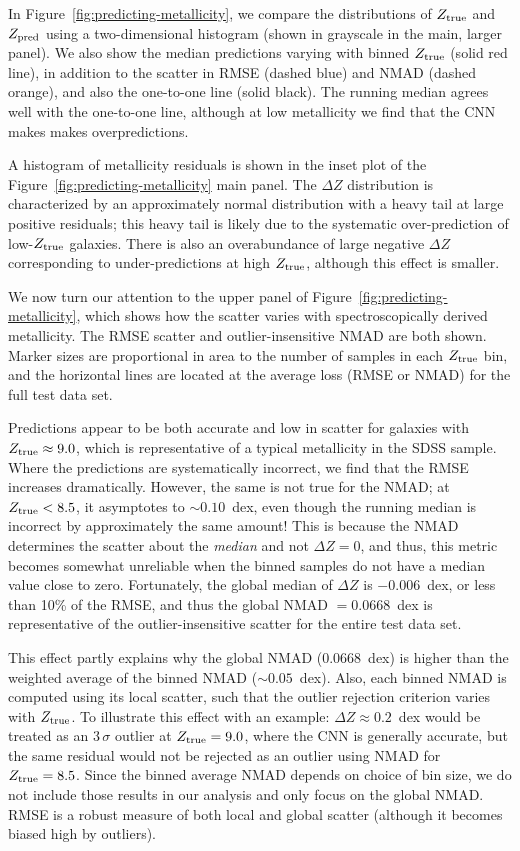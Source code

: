 \documentclass[fleqn,usenatbib]{mnras}
\begin{document}
In Figure~\ref{fig:predicting-metallicity}, we compare the distributions of $Z_{\rm true}$ and $Z_{\rm pred}$ using a two-dimensional histogram (shown in grayscale in the main, larger panel). We also show the median predictions varying with binned $Z_{\rm true}$ (solid red line), in addition to the scatter in RMSE (dashed blue) and NMAD (dashed orange), and also the one-to-one line (solid black). The running median agrees well with the one-to-one line, although at low metallicity we find that the CNN makes makes overpredictions.

A histogram of metallicity residuals is shown in the inset plot of the Figure~\ref{fig:predicting-metallicity} main panel. The $\Delta Z$ distribution is characterized by an approximately normal distribution with a heavy tail at large positive residuals; this heavy tail is likely due to the systematic over-prediction of low-$Z_{\rm true}$ galaxies.
There is also an overabundance of large negative $\Delta Z$ corresponding to under-predictions at high $Z_{\rm true}$, although this effect is smaller.

We now turn our attention to the upper panel of Figure~\ref{fig:predicting-metallicity}, which shows how the scatter varies with spectroscopically derived metallicity. The RMSE scatter and outlier-insensitive NMAD are both shown. Marker sizes are proportional in area to the number of samples in each $Z_{\rm true}$ bin, and the horizontal lines are located at the average loss (RMSE or NMAD) for the full test data set.

Predictions appear to be both accurate and low in scatter for galaxies with $Z_{\rm true} \approx 9.0$, which is representative of a typical metallicity in the SDSS sample. Where the predictions are systematically incorrect, we find that the RMSE increases dramatically. However, the same is not true for the NMAD; at $Z_{\rm true} < 8.5$, it asymptotes to $\sim 0.10$~dex, even though the running median is incorrect by approximately the same amount! This is because the NMAD determines the scatter about the \textit{median} and not $\Delta Z = 0$, and thus, this metric becomes somewhat unreliable when the binned samples do not have a median value close to zero. Fortunately, the global median of $\Delta Z$ is $-0.006$~dex, or less than 10\% of the RMSE, and thus the global NMAD $= 0.0668$~dex is representative of the outlier-insensitive scatter for the entire test data set.

This effect partly explains why the global NMAD ($0.0668$~dex) is higher than the weighted average of the binned NMAD ($\sim 0.05$~dex). Also, each binned NMAD is computed using its local scatter, such that the outlier rejection criterion varies with $Z_{\rm true}$. To illustrate this effect with an example: $\Delta Z \approx 0.2$~dex would be treated as an $3\,\sigma$ outlier at $Z_{\rm true} = 9.0$, where the CNN is generally accurate, but the same residual would not be rejected as an outlier using NMAD for $Z_{\rm true} = 8.5$.
Since the binned average NMAD depends on choice of bin size, we do not include those results in our analysis and only focus on the global NMAD.
RMSE is a robust measure of both local and global scatter (although it becomes biased high by outliers).
\end{document}
